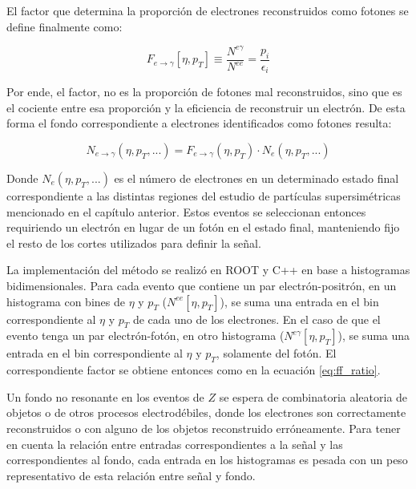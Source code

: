 El factor que determina la proporción de electrones reconstruidos como fotones se define finalmente como:

\begin{equation}
F_{e\rightarrow\gamma}[\eta , p_{T}]\equiv\frac{N^{e\gamma}}{N^{ee}}=\frac{p_{i}}{\epsilon_{i}}
\end{equation}

Por ende, el factor, no es la proporción de fotones mal reconstruidos, sino que es el cociente entre esa proporción y la eficiencia de reconstruir un electrón. De esta forma el fondo correspondiente a electrones identificados como fotones resulta:

\begin{equation}
N_{e\rightarrow\gamma}(\eta , p_{T} , ... ) = F_{e\rightarrow\gamma}(\eta , p_{T})\cdot N_{e}(\eta , p_{T} , ...)
\end{equation}
	
Donde $N_{e}(\eta , p_{T} , ...)$ es el número de electrones en un determinado estado final correspondiente a las distintas regiones del estudio de partículas supersimétricas mencionado en el capítulo anterior. Estos eventos se seleccionan entonces requiriendo un electrón en lugar de un fotón en el estado final, manteniendo fijo el resto de los cortes utilizados para definir la señal. 

La implementación del método se realizó en ROOT y C++ en base a histogramas bidimensionales. Para cada evento que contiene un par electrón-positrón, en un histograma con bines de $\eta$ y $p_{T}$ ($N^{ee}[\eta , p_{T}]$), se suma una entrada en el bin correspondiente al $\eta$ y $p_{T}$ de cada uno de los electrones. En el caso de que el evento tenga un par electrón-fotón, en otro histograma ($N^{e\gamma}[\eta , p_{T}]$), se suma una entrada en el bin correspondiente al $\eta$ y $p_{T}$, solamente del fotón. El correspondiente factor se obtiene entonces como en la ecuación \ref{eq:ff_ratio}.

Un fondo no resonante en los eventos de $Z$ se espera de combinatoria aleatoria de objetos o de otros procesos electrodébiles, donde los electrones son correctamente reconstruidos o con alguno de los objetos reconstruido erróneamente. Para tener en cuenta la relación entre entradas correspondientes a la señal y las correspondientes al fondo, cada entrada en los histogramas es pesada con un peso representativo de esta relación entre señal y fondo.



